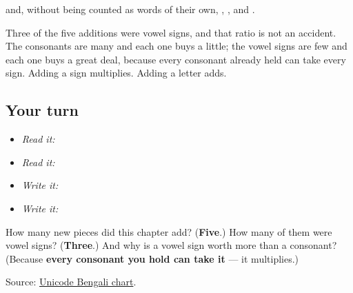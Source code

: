 and, without being counted as words of their own, \textbf{}, \textbf{}, \textbf{} and \textbf{}.

Three of the five additions were vowel signs, and that ratio is not an accident. The consonants are many and each one buys a little; the vowel signs are few and each one buys a great deal, because every consonant already held can take every sign. Adding a sign multiplies. Adding a letter adds.

\subsection*{Your turn}
\begin{itemize}
\raggedright
  \item \emph{Read it:}      
  \item \emph{Read it:} 
  \item \emph{Write it:} 
  \item \emph{Write it:}  
\end{itemize}

\begin{tcolorbox}[breakable,colback=teal!4,colframe=teal!35!black,title={Before you move on}]
How many new pieces did this chapter add? (\textbf{Five}.) How many of them were vowel signs? (\textbf{Three}.) And why is a vowel sign worth more than a consonant? (Because \textbf{every consonant you hold can take it} — it multiplies.)

Source: \href{https://www.unicode.org/charts/PDF/U0980.pdf}{Unicode Bengali chart}.
\end{tcolorbox}
